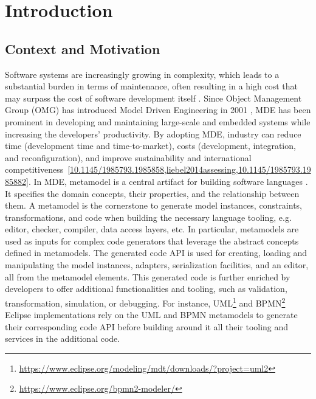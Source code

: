 \chapter{Introduction}
\label{introduction}



\section{Context and Motivation}
\label{introcontext}
Software systems are increasingly growing in complexity, which leads to a substantial burden in terms of maintenance, often resulting in a high cost that may surpass the cost of software development itself \cite{https://doi.org/10.1049/sfw2.12075}.
Since Object Management Group (OMG) has introduced Model Driven Engineering in 2001 \cite{brambilla2017model}, MDE has been prominent in developing and maintaining large-scale and embedded systems while increasing the developers' productivity. By adopting MDE, industry can reduce time (development time and time-to-market), costs (development, integration, and reconfiguration), and improve sustainability and international competitiveness~\ref{10.1145/1985793.1985858,liebel2014assessing,10.1145/1985793.1985882}. %
 In MDE, metamodel is a central artifact for building software languages \cite{cabot2012object}. It specifies the domain concepts, their properties, and the relationship between them.
A metamodel is the cornerstone to generate model instances, constraints, transformations, and code when building the necessary language tooling, e.g. editor, checker, compiler, data access layers, etc. 
In particular, metamodels are used as inputs for complex code generators that leverage the abstract concepts defined in metamodels. The generated code API is used for creating, loading and manipulating the model instances, adapters, serialization facilities, and an editor, all from the metamodel elements.
This generated code is further enriched by developers to offer additional functionalities and tooling, such as validation, transformation, simulation, or debugging.
For instance, UML\footnote{\url{https://www.eclipse.org/modeling/mdt/downloads/?project=uml2}}  and BPMN\footnote{\url{https://www.eclipse.org/bpmn2-modeler/}} Eclipse implementations rely on the UML and BPMN metamodels to generate their corresponding code API before building around it all their tooling and services in the additional code.
